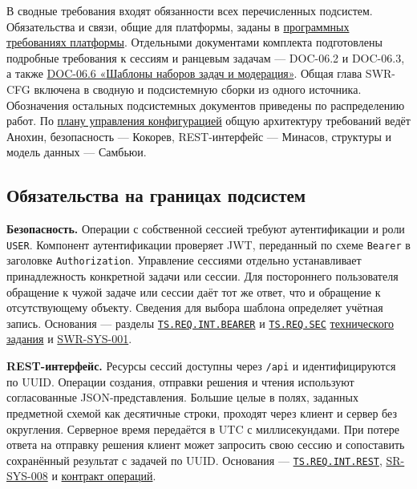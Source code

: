 \documentclass[12pt,a4paper]{article}
\begin{document}
В сводные требования входят обязанности всех перечисленных подсистем. Обязательства и связи, общие для платформы, заданы в {\hyperlink{doc-06-программные-требования-платформы}{программных требованиях платформы}}. Отдельными документами комплекта подготовлены подробные требования к сессиям и ранцевым задачам --- DOC-06.2 и DOC-06.3, а также {\href{DOC-06.6\_Конфигурации\_и\_модерация.pdf\#doc-066-шаблоны-наборов-задач-и-модерация}{DOC-06.6 «Шаблоны наборов задач и модерация»}}. Общая глава SWR-CFG включена в сводную и подсистемную сборки из одного источника. Обозначения остальных подсистемных документов приведены по распределению работ. По {\href{../../03\_ПУКПО\_План\_управления\_конфигурацией/ПУКПО.pdf}{плану управления конфигурацией}} общую архитектуру требований ведёт Анохин, безопасность --- Кокорев, REST-интерфейс --- Минасов, структуры и модель данных --- Самбьюи.

\subsection{Обязательства на границах подсистем}\label{ux43eux431ux44fux437ux430ux442ux435ux43bux44cux441ux442ux432ux430-ux43dux430-ux433ux440ux430ux43dux438ux446ux430ux445-ux43fux43eux434ux441ux438ux441ux442ux435ux43c}

\hypertarget{обязательства-на-границах-подсистем}{}

\textbf{Безопасность.} Операции с собственной сессией требуют аутентификации и роли \texttt{USER}. Компонент аутентификации проверяет JWT, переданный по схеме \texttt{Bearer} в заголовке \texttt{Authorization}. Управление сессиями отдельно устанавливает принадлежность конкретной задачи или сессии. Для постороннего пользователя обращение к чужой задаче или сессии даёт тот же ответ, что и обращение к отсутствующему объекту. Сведения для выбора шаблона определяет учётная запись. Основания --- разделы {\href{../02\_Техническое\_задание/DOC-02\_Техническое\_задание.pdf\#ts-req-int-bearer}{\texttt{TS.\allowbreak{}REQ.\allowbreak{}INT.\allowbreak{}BEARER}}} и {\href{../02\_Техническое\_задание/DOC-02\_Техническое\_задание.pdf\#ts-req-sec}{\texttt{TS.REQ.SEC}}} {\href{../02\_Техническое\_задание/DOC-02\_Техническое\_задание.pdf\#doc-02-техническое-задание}{технического задания}} и {\hyperlink{swr-sys-001}{SWR-SYS-001}}.

\textbf{REST-интерфейс.} Ресурсы сессий доступны через \texttt{/api} и идентифицируются по UUID. Операции создания, отправки решения и чтения используют согласованные JSON-представления. Большие целые в полях, заданных предметной схемой как десятичные строки, проходят через клиент и сервер без округления. Серверное время передаётся в UTC с миллисекундами. При потере ответа на отправку решения клиент может запросить свою сессию и сопоставить сохранённый результат с задачей по UUID. Основания --- {\href{../02\_Техническое\_задание/DOC-02\_Техническое\_задание.pdf\#ts-req-int-rest}{\texttt{TS.\allowbreak{}REQ.\allowbreak{}INT.\allowbreak{}REST}}}, {\href{../04\_Системные\_требования/DOC-05\_Системные\_требования.pdf\#sr-sys-008}{SR-SYS-008}} и {\href{DOC-06.2\_Сессии\_задач\_и\_планировщик.pdf\#операции}{контракт операций}}.
\end{document}
